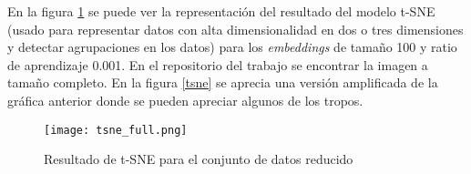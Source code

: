 \begin{center}
  \begin{table}
  \caption{Tropos similares usando \textit{embeddings} de tamaño 75}
  \label{w75}
  \end{table}
\end{center}


\begin{center}
\begin{table}
  \caption{Tropos similares usando \textit{embeddings} de tamaño 100}
  \label{w100}
\end{table}
\end{center}

En la figura \ref{tsne_full} se puede ver la representación del resultado del modelo t-SNE (usado para representar datos con alta dimensionalidad en dos o tres dimensiones y detectar agrupaciones en los datos)
para los \textit{embeddings} de tamaño 100 y ratio de aprendizaje 0.001.
En el repositorio del trabajo se encontrar la imagen a tamaño completo. En la figura \ref{tsne} se aprecia una versión amplificada de la gráfica anterior donde
se pueden apreciar algunos de los tropos.

\begin{figure}\label{tsne_full}
  \texttt{[image: tsne\_full.png]}
  \centering
  \caption{Resultado de t-SNE para el conjunto de datos reducido}
\end{figure}

